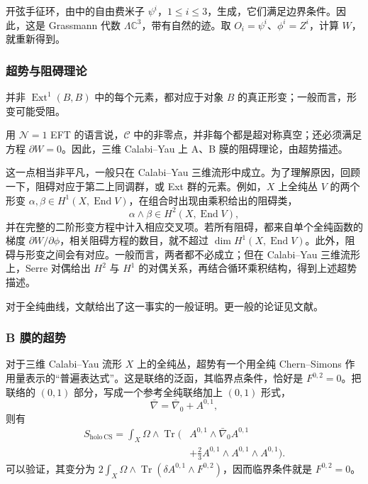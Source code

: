 \begin{example}\label{ex:5.26}
开弦手征环，由中的自由费米子 $\psi^i$，$1\le i\le3$，生成，它们满足边界条件。因此，这是 Grassmann 代数 $\Lambda\mathbb{C}^3$，带有自然的迹。取 $O_i=\psi^i$、$\phi^i=Z^i$，计算 $W$，就重新得到。
\end{example}

\subsubsection{超势与阻碍理论}\label{sec:5.4.3.3}

并非 $\operatorname{Ext}^1(B,B)$ 中的每个元素，都对应于对象 $B$ 的真正形变；一般而言，形变可能受阻。

用 $\mathcal{N}=1$ EFT 的语言说，$\mathcal{C}$ 中的非零点，并非每个都是超对称真空；还必须满足方程 $\partial W=0$。因此，三维 Calabi--Yau 上 A、B 膜的阻碍理论，由超势描述。

这一点相当非平凡，一般只在 Calabi--Yau 三维流形中成立。为了理解原因，回顾一下，阻碍对应于第二上同调群，或 Ext 群的元素。例如，$X$ 上全纯丛 $V$ 的两个形变 $\alpha,\beta\in H^1(X,\operatorname{End}V)$，在组合时出现由乘积给出的阻碍类，
\[
\alpha\wedge\beta\in H^2(X,\operatorname{End}V),
\]
并在完整的二阶形变方程中计入相应交叉项。若所有阻碍，都来自单个全纯函数的梯度 $\partial W/\partial\phi$，相关阻碍方程的数目，就不超过 $\dim H^1(X,\operatorname{End}V)$。此外，阻碍与形变之间会有对应。一般而言，两者都不必成立；但在 Calabi--Yau 三维流形上，Serre 对偶给出 $H^2$ 与 $H^1$ 的对偶关系，再结合循环乘积结构，得到上述超势描述。

对于全纯曲线，文献给出了这一事实的一般证明。更一般的论证见文献。

\subsubsection{B 膜的超势}\label{sec:5.4.3.4}

对于三维 Calabi--Yau 流形 $X$ 上的全纯丛，超势有一个用全纯 Chern--Simons 作用量表示的“普遍表达式”。这是联络的泛函，其临界点条件，恰好是 $F^{0,2}=0$。把联络的 $(0,1)$ 部分，写成一个参考全纯联络加上 $(0,1)$ 形式，
\[
\bar\nabla=\bar\nabla_0+A^{0,1},
\]
则有
\begin{equation}\label{eq:5.90}
\begin{aligned}
S_{\mathrm{holo\,CS}}=\int_X\Omega\wedge\operatorname{Tr}\bigl(
&A^{0,1}\wedge\bar\nabla_0A^{0,1}\\
&+\tfrac23 A^{0,1}\wedge A^{0,1}\wedge A^{0,1}\bigr).
\end{aligned}
\end{equation}
可以验证，其变分为 $2\int_X\Omega\wedge\operatorname{Tr}(\delta A^{0,1}\wedge F^{0,2})$，因而临界条件就是 $F^{0,2}=0$。

